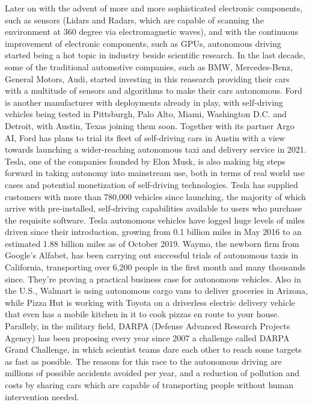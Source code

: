 Later on with the advent of more and more sophisticated electronic components, such as sensors (Lidars and Radars, which are capable of scanning the environment at 360 degree via electromagnetic waves), and with the continuous improvement of electronic components, such as GPUs, autonomous driving started being a hot topic in industry beside scientific research.
In the last decade, some of the traditional automotive companies, such as BMW, Mercedes-Benz, General Motors, Audi, started investing in this reasearch providing their cars with a multitude of sensors and algorithms to make their cars autonomous. Ford is another manufacturer with deployments already in play, with self-driving vehicles being tested in Pittsburgh, Palo Alto, Miami, Washington D.C. and Detroit, with Austin, Texas joining them soon. Together with its partner Argo AI, Ford has plans to trial its fleet of self-driving cars in Austin with a view towards launching a wider-reaching autonomous taxi and delivery service in 2021.
Tesla, one of the companies founded by Elon Musk, is also making big steps forward in taking autonomy into mainstream use, both in terms of real world use cases and potential monetization of self-driving technologies. Tesla has supplied customers with more than 780,000 vehicles since launching, the majority of which arrive with pre-installed, self-driving capabilities available to users who purchase the requisite software. Tesla autonomous vehicles have logged huge levels of miles driven since their introduction, growing from 0.1 billion miles in May 2016 to an estimated 1.88 billion miles as of October 2019.
Waymo, the newborn firm from Google's Alfabet, has been carrying out successful trials of autonomous taxis in California, transporting over 6,200 people in the first month and many thousands since. They're proving a practical business case for autonomous vehicles.
Also in the U.S., Walmart is using autonomous cargo vans to deliver groceries in Arizona, while Pizza Hut is working with Toyota on a driverless electric delivery vehicle that even has a mobile kitchen in it to cook pizzas en route to your house.
Parallely, in the military field, DARPA (Defense Advanced Research Projects Agency) has been proposing every year since 2007 a challenge called DARPA Grand Challenge, in which scientist teams dare each other to reach some targets as fast as possible.
The reasons for this race to the autonomous driving are millions of possible accidents avoided per year, and a reduction of pollution and costs by sharing cars which are capable of transporting people without human intervention needed.
